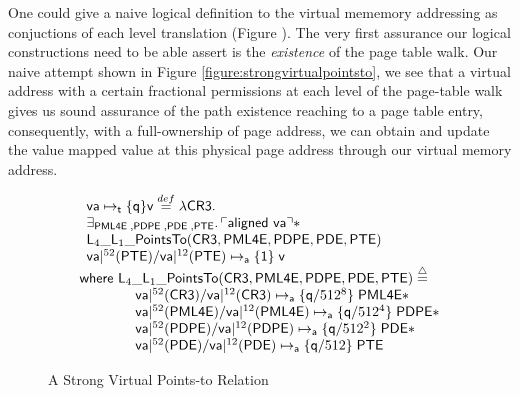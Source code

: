 \begin{remark}
  \label{rem:strongvmem}
  One could give a naive logical definition to the virtual mememory addressing as conjuctions of each level translation (Figure ). The very first assurance our logical constructions need to be able assert is the \textit{existence} of the page table walk. Our naive attempt shown in Figure \ref{figure:strongvirtualpointsto}, we see that a virtual address with a certain fractional permissions at each level of the page-table walk gives us sound assurance of the path existence reaching to a page table entry, consequently, with a full-ownership of page address, we can obtain and update the value mapped value at this physical page address through our virtual memory address. 

\begin{figure*}
  \[
  \begin{array}{l}
\begin{array}{l}
  \mathsf{va}\mapsto_{\textsf{t}}\{\textsf{q}\}\textsf{v} \stackrel{def}{=} \lambda \textsf{CR3}.\\
  \exists_{\textsf{PML4E} \;, \textsf{PDPE} \;, \textsf{PDE} \;,\textsf{PTE}} \ldotp 

  \ulcorner \textsf{aligned } \mathsf{va} \urcorner \ast  \\
  \textsf{L}_{4}\_\textsf{L}_{1}\_\textsf{PointsTo}(\textsf{CR3},\textsf{PML4E},\textsf{PDPE},\textsf{PDE},\textsf{PTE})\\
   \mathsf{va}|^{52}(\textsf{PTE}) / \mathsf{va}|^{12}(\textsf{PTE}) \mapsto_{\mathsf{a}}\{\mathsf{1}\}\;\textsf{v} 
\end{array} \\

\textsf{where   }\textsf{L}_{4}\_\textsf{L}_{1}\_\textsf{PointsTo}(\textsf{CR3},\textsf{PML4E},\textsf{PDPE},\textsf{PDE},\textsf{PTE}) \stackrel{\triangle}{=} \\
 \qquad\qquad \mathsf{va}|^{52}(\textsf{CR3}) / \mathsf{va}|^{12}(\textsf{CR3}) \mapsto_{\mathsf{a}}\{\mathsf{q}/512^{8}\}\;\textsf{PML4E} \ast \\ 
 \qquad\qquad  \mathsf{va}|^{52}(\textsf{PML4E}) / \mathsf{va}|^{12}(\textsf{PML4E}) \mapsto_{\mathsf{a}}\{\mathsf{q}/512^{4}\}\;\textsf{PDPE}  \ast  \\
  \qquad\qquad \mathsf{va}|^{52}(\textsf{PDPE}) / \mathsf{va}|^{12}(\textsf{PDPE}) \mapsto_{\mathsf{a}}\{\mathsf{q}/512^{2}\}\;\textsf{PDE} \ast \\
  \qquad\qquad \mathsf{va}|^{52}(\textsf{PDE}) / \mathsf{va}|^{12}(\textsf{PDE}) \mapsto_{\mathsf{a}}\{\mathsf{q}/512\}\;\textsf{PTE} 
   \end{array}
\]
\caption{A Strong Virtual Points-to Relation}
  \label{fig:strongvirtualpointsto}
\end{figure*}
\end{remark}

